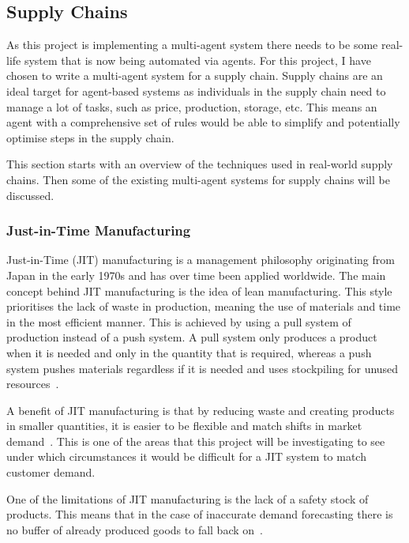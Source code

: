 \subsection{Supply Chains}

As this project is implementing a multi-agent system there needs to be some real-life system that is now being automated via agents.
For this project, I have chosen to write a multi-agent system for a supply chain.
Supply chains are an ideal target for agent-based systems as individuals in the supply chain need to manage a lot of tasks, such as price, production, storage, etc.
This means an agent with a comprehensive set of rules would be able to simplify and potentially optimise steps in the supply chain.

This section starts with an overview of the techniques used in real-world supply chains.
Then some of the existing multi-agent systems for supply chains will be discussed.

\subsubsection{Just-in-Time Manufacturing}

Just-in-Time (JIT) manufacturing is a management philosophy originating from Japan in the early 1970s and has over time been applied worldwide.
The main concept behind JIT manufacturing is the idea of lean manufacturing.
This style prioritises the lack of waste in production, meaning the use of materials and time in the most efficient manner.
This is achieved by using a pull system of production instead of a push system.
A pull system only produces a product when it is needed and only in the quantity that is required, whereas a push system pushes materials regardless if it is needed and uses stockpiling for unused resources~\cite{javadian2013just}.

A benefit of JIT manufacturing is that by reducing waste and creating products in smaller quantities, it is easier to be flexible and match shifts in market demand~\cite{javadian2013just}.
This is one of the areas that this project will be investigating to see under which circumstances it would be difficult for a JIT system to match customer demand.

One of the limitations of JIT manufacturing is the lack of a safety stock of products.
This means that in the case of inaccurate demand forecasting there is no buffer of already produced goods to fall back on~\cite{javadian2013just}.

